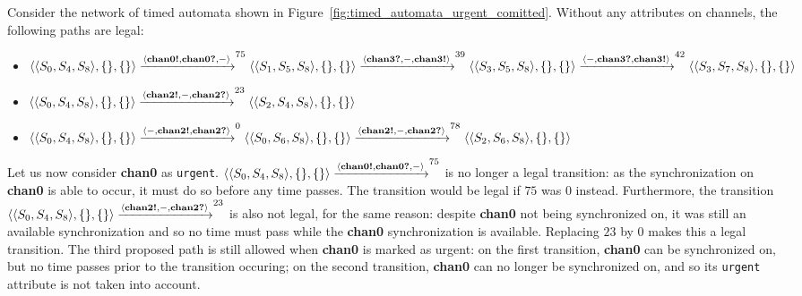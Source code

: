 \begin{example}
\label{ex:urgent_vs_committed_locations}
Consider the network of timed automata shown in Figure~\ref{fig:timed_automata_urgent_comitted}.
Without any attributes on channels, the following paths are legal:
\begin{itemize}
\item
$
   \langle \langle S_0, S_4, S_8 \rangle, \{\}, \{\}\rangle \allowbreak
   \xrightarrow[]{\langle \textbf{chan0!}, \textbf{chan0?}, -\rangle}^{75} \allowbreak
   \langle \langle S_1, S_5, S_8 \rangle, \{\}, \{\}\rangle \allowbreak
   \xrightarrow[]{\langle \textbf{chan3?}, -, \textbf{chan3!}\rangle}^{39} \allowbreak
   \langle \langle S_3, S_5, S_8 \rangle, \{\}, \{\}\rangle \allowbreak
   \xrightarrow[]{\langle -, \textbf{chan3?}, \textbf{chan3!}\rangle}^{42} \allowbreak
   \langle \langle S_3, S_7, S_8 \rangle, \{\}, \{\}\rangle
$
\item
$
   \langle \langle S_0, S_4, S_8 \rangle, \{\}, \{\}\rangle \allowbreak
   \xrightarrow[]{\langle \textbf{chan2!}, -, \textbf{chan2?}\rangle}^{23}
   \allowbreak
   \langle \langle S_2, S_4, S_8 \rangle, \{\}, \{\}\rangle \allowbreak
$
\item
$
   \langle \langle S_0, S_4, S_8 \rangle, \{\}, \{\}\rangle \allowbreak
   \xrightarrow[]{\langle -, \textbf{chan2!}, \textbf{chan2?}\rangle}^{0}
   \allowbreak
   \langle \langle S_0, S_6, S_8 \rangle, \{\}, \{\}\rangle \allowbreak
   \xrightarrow[]{\langle \textbf{chan2!}, -, \textbf{chan2?}\rangle}^{78}
   \allowbreak
   \langle \langle S_2, S_6, S_8 \rangle, \{\}, \{\}\rangle \allowbreak
$
\end{itemize}
Let us now consider \textbf{chan0} as \texttt{urgent}.
$
   \langle \langle S_0, S_4, S_8 \rangle, \{\}, \{\}\rangle \allowbreak
   \xrightarrow[]{\langle \textbf{chan0!}, \textbf{chan0?}, -\rangle}^{75}
   \allowbreak
$
is no longer a legal transition: as the synchronization on \textbf{chan0} is
able to occur, it must do so before any time passes. The transition would be
legal if $75$ was $0$ instead. Furthermore, the transition
$
   \langle \langle S_0, S_4, S_8 \rangle, \{\}, \{\}\rangle \allowbreak
   \xrightarrow[]{\langle \textbf{chan2!}, -, \textbf{chan2?}\rangle}^{23}
$ is also not legal, for the same reason: despite \textbf{chan0} not being
synchronized on, it was still an available synchronization and so no time must
pass while the \textbf{chan0} synchronization is available. Replacing $23$ by
$0$ makes this a legal transition. The third proposed path is still allowed
when \textbf{chan0} is marked as urgent: on the first transition, \textbf{chan0}
can be synchronized on, but no time passes prior to the transition occuring;
on the second transition, \textbf{chan0} can no longer be synchronized on, and
so its \texttt{urgent} attribute is not taken into account.


\end{example}
